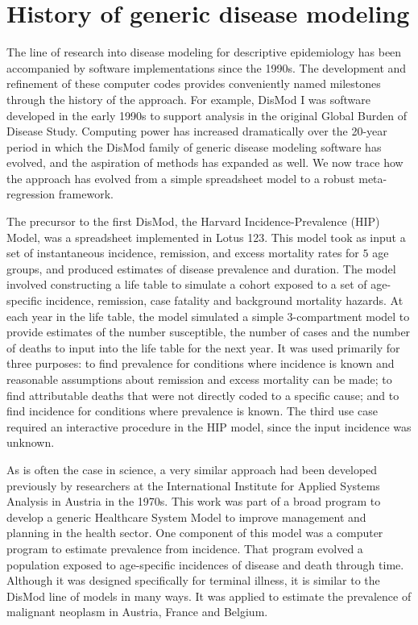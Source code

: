 \section{History of generic disease modeling}

The line of research into disease modeling for descriptive
epidemiology has been accompanied by software implementations since
the 1990s.  The development and refinement of these computer codes
provides conveniently named milestones through the history of the
approach.  For example, DisMod I was software developed in the early
1990s to support analysis in the original Global Burden of Disease
Study.  Computing power has increased dramatically over the 20-year
period in which the DisMod family of generic disease modeling software
has evolved, and the aspiration of methods has expanded as well. We
now trace how the approach has evolved from a simple spreadsheet model
to a robust meta-regression framework.

The precursor to the first DisMod, the Harvard Incidence-Prevalence
(HIP) Model, was a spreadsheet implemented in Lotus 123.
\cite{Murray_Quantifying_1994} This model took as input a set of
instantaneous incidence, remission, and excess mortality rates for $5$
age groups, and produced estimates of disease prevalence and duration.
The model involved constructing a life table to simulate a cohort
exposed to a set of age-specific incidence, remission, case fatality
and background mortality hazards. At each year in the life table, the
model simulated a simple 3-compartment model to provide estimates of
the number susceptible, the number of cases and the number of deaths
to input into the life table for the next year.  It was used primarily
for three purposes: to find prevalence for conditions where incidence
is known and reasonable assumptions about remission and excess
mortality can be made; to find attributable deaths that were not
directly coded to a specific cause; and to find incidence for
conditions where prevalence is known.  The third use case required an
interactive procedure in the HIP model, since the input incidence was
unknown.

As is often the case in science, a very similar approach had been
developed previously by researchers at the International Institute
for Applied Systems Analysis in Austria in the 1970s.\cite{international_institute_for_applied_systems_analysis._estimation_1977} This work was
part of a broad program to develop a generic Healthcare System Model
to improve management and planning in the health sector. One component
of this model was a computer program to estimate prevalence from
incidence. That program evolved a population
exposed to age-specific incidences of disease and death through time.
Although it was designed specifically for terminal illness, it is
similar to the DisMod line of models in many ways. It was applied to
estimate the prevalence of malignant neoplasm in Austria, France and
Belgium.


